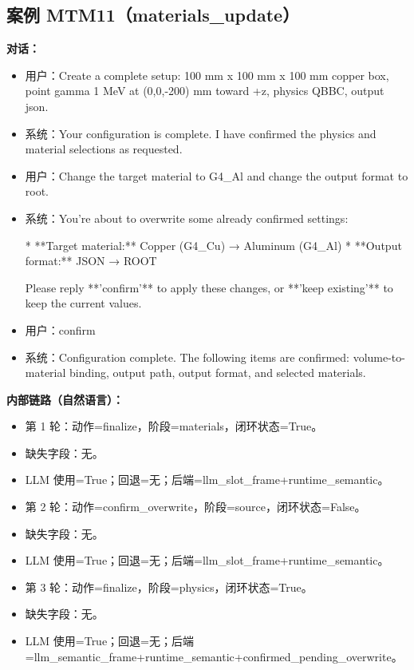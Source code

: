 \documentclass[11pt]{ctexart}
\begin{document}
\subsection{案例 MTM11（materials\_update）}
\textbf{对话：}
\begin{itemize}
\item 用户：Create a complete setup: 100 mm x 100 mm x 100 mm copper box, point gamma 1 MeV at (0,0,-200) mm toward +z, physics QBBC, output json.
\item 系统：Your configuration is complete. I have confirmed the physics and material selections as requested.
\item 用户：Change the target material to G4\_Al and change the output format to root.
\item 系统：You're about to overwrite some already confirmed settings:

*   **Target material:** Copper (G4\_Cu) → Aluminum (G4\_Al)
*   **Output format:** JSON → ROOT

Please reply **'confirm'** to apply these changes, or **'keep existing'** to keep the current values.
\item 用户：confirm
\item 系统：Configuration complete. The following items are confirmed: volume-to-material binding, output path, output format, and selected materials.
\end{itemize}
\textbf{内部链路（自然语言）：}
\begin{itemize}
\item 第 1 轮：动作=finalize，阶段=materials，闭环状态=True。
\item 缺失字段：无。
\item LLM 使用=True；回退=无；后端=llm\_slot\_frame+runtime\_semantic。
\item 第 2 轮：动作=confirm\_overwrite，阶段=source，闭环状态=False。
\item 缺失字段：无。
\item LLM 使用=True；回退=无；后端=llm\_slot\_frame+runtime\_semantic。
\item 第 3 轮：动作=finalize，阶段=physics，闭环状态=True。
\item 缺失字段：无。
\item LLM 使用=True；回退=无；后端=llm\_semantic\_frame+runtime\_semantic+confirmed\_pending\_overwrite。
\end{itemize}
\end{document}
